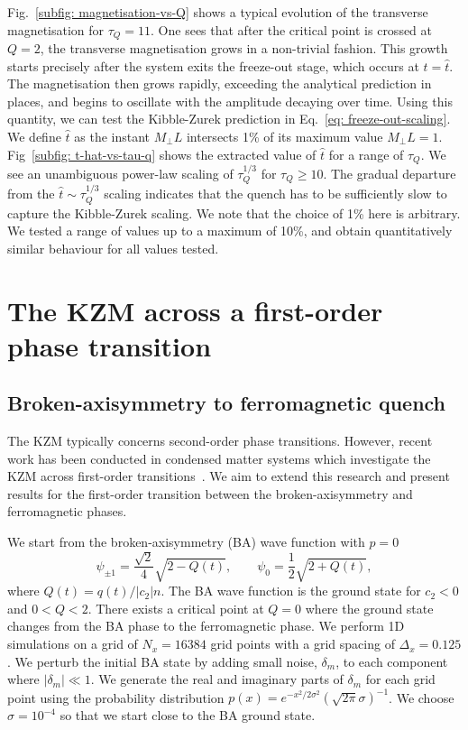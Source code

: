 Fig.~\ref{subfig: magnetisation-vs-Q} shows a typical evolution of the
transverse magnetisation for \(\tau_Q = 11\).
One sees that after the critical point is crossed at \( Q = 2 \), the transverse
magnetisation grows in a non-trivial fashion.
This growth starts precisely after the system exits the freeze-out stage, which
occurs at \(t=\hat{t}\).
The magnetisation then grows rapidly, exceeding the analytical prediction in
places, and begins to oscillate with the amplitude decaying over time.
Using this quantity, we can test the Kibble-Zurek prediction in
Eq.~\eqref{eq: freeze-out-scaling}.
We define \( \hat{t} \) as the instant \(M_\perp L\) intersects 1\% of its maximum
value \(M_\perp L = 1\).
Fig~\ref{subfig: t-hat-vs-tau-q} shows the extracted value of \( \hat{t} \) for a
range of \( \tau_Q \).
We see an unambiguous power-law scaling of \(\tau_Q^{1/3}\) for
\(\tau_Q \geq 10\).
The gradual departure from the \(\hat{t} \sim \tau_Q^{1/3}\) scaling indicates
that the quench has to be sufficiently slow to capture the Kibble-Zurek scaling.
We note that the choice of 1\% here is arbitrary.
We tested a range of values up to a maximum of 10\%, and obtain quantitatively
similar behaviour for all values tested.

\section{The KZM across a first-order phase transition}
\subsection{Broken-axisymmetry to ferromagnetic quench}
The KZM typically concerns second-order phase transitions. However, recent
work has been conducted in condensed matter systems which investigate
the KZM across first-order transitions~\cite{Qiu2020}.
We aim to extend this research and present results for
the first-order transition between the broken-axisymmetry and
ferromagnetic phases.

We start from the broken-axisymmetry (BA) wave function with \( p=0 \)
\begin{equation}
    \psi_{\pm 1} = \frac{\sqrt{2}}{4}\sqrt{2 - Q(t)}, \qquad
    \psi_0 = \frac{1}{2}\sqrt{2 + Q(t)},
    \label{eq: BA-initial-wavefunction}
\end{equation}
where \(Q(t)=q(t)/|c_2|n\).
The BA wave function is the ground state for \(c_2 < 0\) and \(0 < Q < 2\).
There exists a critical point at \( Q = 0 \) where the ground state changes from
the BA phase to the ferromagnetic phase.
We perform 1D simulations on a grid of \(N_x = 16384\) grid points with a grid
spacing of \(\Delta_x = 0.125\).
We perturb the initial BA state by adding small noise, \(\delta_m\), to each
component where \(|\delta_m| \ll 1\).
We generate the real and imaginary parts of \(\delta_m\) for each grid point
using the probability distribution
\(p(x) = e^{-x^2/2\sigma^2}{(\sqrt{2\pi}\sigma)}^{-1}\).
We choose \(\sigma=10^{-4}\) so that we start close to the BA ground state.

